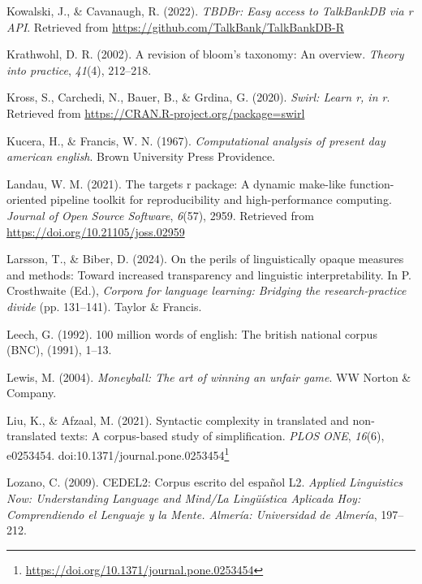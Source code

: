 \documentclass[
  letterpaper,
]{book}
\newlength{\cslhangindent}
\newenvironment{CSLReferences}[2] %
 {\begin{list}{}{%
  \setlength{\itemindent}{0pt}
  \setlength{\leftmargin}{0pt}
  \setlength{\parsep}{0pt}
  \ifodd #1
   \setlength{\leftmargin}{\cslhangindent}
   \setlength{\itemindent}{-1\cslhangindent}
  \fi
  \setlength{\itemsep}{#2\baselineskip}}}
 {\end{list}}
\theoremstyle{definition}
\theoremstyle{remark}
\DeclareRobustCommand{\href}[2]{#2\footnote{\url{#1}}}
\begin{document}
\begin{CSLReferences}{1}{0}
Kowalski, J., \& Cavanaugh, R. (2022). \emph{TBDBr: Easy access to
TalkBankDB via r API}. Retrieved from
\url{https://github.com/TalkBank/TalkBankDB-R}

Krathwohl, D. R. (2002). A revision of bloom's taxonomy: An overview.
\emph{Theory into practice}, \emph{41}(4), 212--218.

Kross, S., Carchedi, N., Bauer, B., \& Grdina, G. (2020). \emph{Swirl:
Learn r, in r}. Retrieved from
\url{https://CRAN.R-project.org/package=swirl}

Kucera, H., \& Francis, W. N. (1967). \emph{Computational analysis of
present day american english}. Brown University Press Providence.

Landau, W. M. (2021). The targets r package: A dynamic make-like
function-oriented pipeline toolkit for reproducibility and
high-performance computing. \emph{Journal of Open Source Software},
\emph{6}(57), 2959. Retrieved from
\url{https://doi.org/10.21105/joss.02959}

Larsson, T., \& Biber, D. (2024). On the perils of linguistically opaque
measures and methods: Toward increased transparency and linguistic
interpretability. In P. Crosthwaite (Ed.), \emph{Corpora for language
learning: Bridging the research-practice divide} (pp. 131--141). Taylor
\& Francis.

Leech, G. (1992). 100 million words of english: The british national
corpus (BNC), (1991), 1--13.

Lewis, M. (2004). \emph{Moneyball: The art of winning an unfair game}.
WW Norton \& Company.

Liu, K., \& Afzaal, M. (2021). Syntactic complexity in translated and
non-translated texts: A corpus-based study of simplification. \emph{PLOS
ONE}, \emph{16}(6), e0253454.
doi:\href{https://doi.org/10.1371/journal.pone.0253454}{10.1371/journal.pone.0253454}

Lozano, C. (2009). CEDEL2: Corpus escrito del espa{ñ}ol L2.
\emph{Applied Linguistics Now: Understanding Language and Mind/La
Ling{ü}{í}stica Aplicada Hoy: Comprendiendo el Lenguaje y la Mente.
Almer{í}a: Universidad de Almer{í}a}, 197--212.


\end{CSLReferences}
\end{document}
